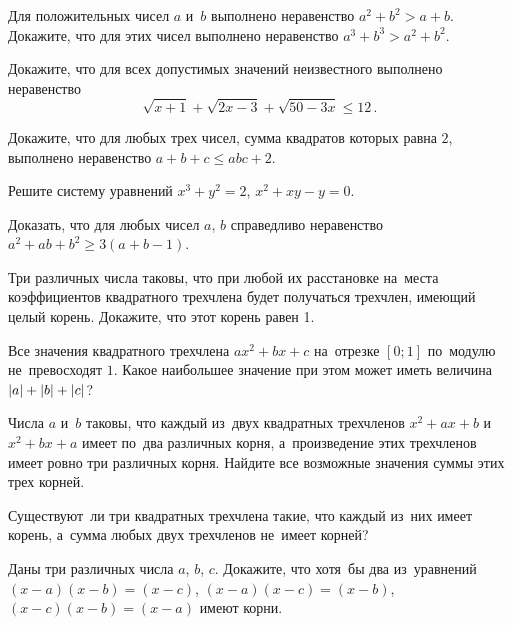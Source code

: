 \begin{problems}

\item
Для положительных чисел $a$ и~$b$ выполнено неравенство $a^2 + b^2 > a + b$.
Докажите, что для этих чисел выполнено неравенство $a^3 + b^3 > a^2 + b^2$.

\item
Докажите, что для всех допустимых значений неизвестного выполнено неравенство
\[
    \sqrt{x + 1} + \sqrt{2 x - 3} + \sqrt{50 - 3 x} \leq 12
\, . \]

\item
Докажите, что для любых трех чисел, сумма квадратов которых равна $2$,
выполнено неравенство $a + b + c \leq a b c + 2$.

\item
Решите систему уравнений
$x^3 + y^2 = 2$, $x^2 + x y - y = 0$.

\item
Доказать, что для любых чисел $a$, $b$ справедливо неравенство
$a^2 + a b + b^2 \geq 3 (a + b - 1)$.

\item
Три различных числа таковы, что при любой их расстановке на~места коэффициентов
квадратного трехчлена будет получаться трехчлен, имеющий целый корень.
Докажите, что этот корень равен 1.

\item
Все значения квадратного трехчлена $a x^2 + b x + c$ на~отрезке $[0; 1]$
по~модулю не~превосходят $1$.
Какое наибольшее значение при этом может иметь величина
$\lvert a \rvert + \lvert b \rvert + \lvert c \rvert$?

\item
Числа $a$ и~$b$ таковы, что каждый из~двух квадратных трехчленов
$x^2 + a x + b$ и~$x^2 + b x + a$ имеет по~два различных корня, а~произведение
этих трехчленов имеет ровно три различных корня.
Найдите все возможные значения суммы этих трех корней.

\item
Существуют~ли три квадратных трехчлена такие, что каждый из~них имеет корень,
а~сумма любых двух трехчленов не~имеет корней?

\item
Даны три различных числа $a$, $b$, $c$.
Докажите, что хотя~бы два из~уравнений
$(x - a) (x - b) = (x - c)$, $(x - a) (x - c) = (x - b)$,
$(x - c) (x - b) = (x - a)$ имеют корни.

\end{problems}

\endgroup %

